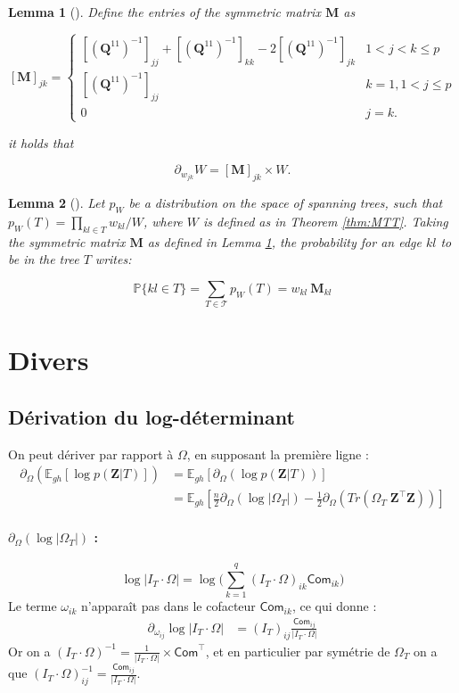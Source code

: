 \documentclass[11pt,a4paper]{article}
\newtheorem{lemma}{Lemma}
\newcommand{\Zbf}{\boldsymbol{Z}}
\newcommand{\Qbf}{\boldsymbol{Q}}
\newcommand{\Mbf}{\boldsymbol{M}}
\newcommand{\Esp}{\mathds{E}}
\begin{document}
\begin{lemma} [\cite{Meila}] \label{lem:Meila}
    Define the entries of the symmetric matrix $\Mbf$ as
 
\[    
 [\Mbf]_{jk} =\begin{cases}
    \left[(\Qbf^{11})^{-1}\right]_{jj} + \left[(\Qbf^{11})^{-1}\right]_{kk} -2\left[(\Qbf^{11})^{-1}\right]_{jk} & 1< j<k \leq p\\
    \left[(\Qbf^{11})^{-1}\right]_{jj} & k=1, 1< j \leq p  \\
    0 &  j=k .
    \end{cases}
\]
 
it holds that
 
$$
\partial_{w_{jk}} W = [\Mbf]_{jk}  \times W.
$$
\end{lemma}
\begin{lemma} [\cite{kirshner}] \label{lem:Kirshner}
    Let $p_W$ be a distribution on the space of spanning trees, such that $p_W(T)=\prod_{kl\in T} w_{kl} / W$, where $W$ is defined as in Theorem \ref{thm:MTT}. Taking the symmetric matrix $\Mbf$ as defined in Lemma  \ref{lem:Meila}, the probability for an edge $kl$ to be in the tree $T$ writes:
 
$$\mathds{P}\{kl\in T\} = \sum_{T\in \mathcal{T}} p_W(T)= w_{kl}\: \Mbf_{kl}$$
\end{lemma}
 \section{Divers}
 
\subsection{Dérivation du log-déterminant}
On peut dériver par rapport à $\Omega$, en supposant la première ligne :
\begin{align}
    \partial_{\Omega}\left(\Esp_{gh}\left[\log p(\Zbf | T)\right] \right)&=  \Esp_{gh}\left[\partial_{\Omega}( \log p(\Zbf | T) )\right] \\
    &=\Esp_{gh}\left[\frac{n}{2}\partial_{\Omega}( \log |\Omega_T|) -\frac{1}{2} \partial_\Omega (Tr(\Omega_T \; \Zbf^\intercal \Zbf ))\right]
\end{align}

\paragraph{\underline{$\partial_{\Omega}( \log |\Omega_T|)$} :}
 $$\log |I_T \cdot \Omega| = \log \big(\sum_{k=1}^q (I_T\cdot \Omega)_{ik} \mathsf{Com}_{ik}\big)$$
Le terme $\omega_{ik}$ n'apparaît pas dans le cofacteur $\mathsf{Com}_{ik}$, ce qui donne :
\begin{align*}
    \partial_{\omega_{ij}} \log |I_T\cdot \Omega| &= (I_T)_{ij} \frac{\mathsf{Com}_{ij}}{|I_T\cdot \Omega |}
\end{align*}
Or on a $(I_T\cdot \Omega)^{-1} = \frac{1}{|I_T \cdot \Omega|}\times \mathsf{Com}^\intercal$, et en particulier par symétrie de $\Omega_T$ on a que $(I_T\cdot \Omega)_{ij}^{-1}=\frac{\mathsf{Com}_{ij}}{|I_T\cdot \Omega |}$.
\end{document}
